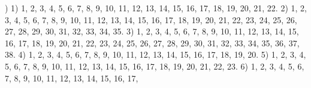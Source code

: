 \documentclass[a4paper,11pt]{article}
\begin{document}
\noindent
{}) 1) 1, 2, 3, 4, 5, 6, 7, 8, 9, 10, 11, 12, 13, 14, 15,
16, 17, 18, 19, 20, 21, 22. 2) 1, 2, 3, 4, 5, 6, 7, 8, 9, 10, 11, 12,
13, 14, 15, 16, 17, 18, 19, 20, 21, 22, 23, 24, 25, 26, 27, 28, 29,
30, 31, 32, 33, 34, 35. 3) 1, 2, 3, 4, 5, 6, 7, 8, 9, 10, 11, 12, 13,
14, 15, 16, 17, 18, 19, 20, 21, 22, 23, 24, 25, 26, 27, 28, 29, 30, 31,
32, 33, 34, 35, 36, 37, 38. 4) 1, 2, 3, 4, 5, 6, 7, 8, 9, 10, 11, 12,
13, 14, 15, 16, 17, 18, 19, 20. 5) 1, 2, 3, 4, 5, 6, 7, 8, 9, 10, 11,
12, 13, 14, 15, 16, 17, 18, 19, 20, 21, 22, 23. 6) 1, 2, 3, 4, 5, 6, 7,
8, 9, 10, 11, 12, 13, 14, 15, 16, 17,


\vspace{\spaceTwo}
























{}






\end{document}
